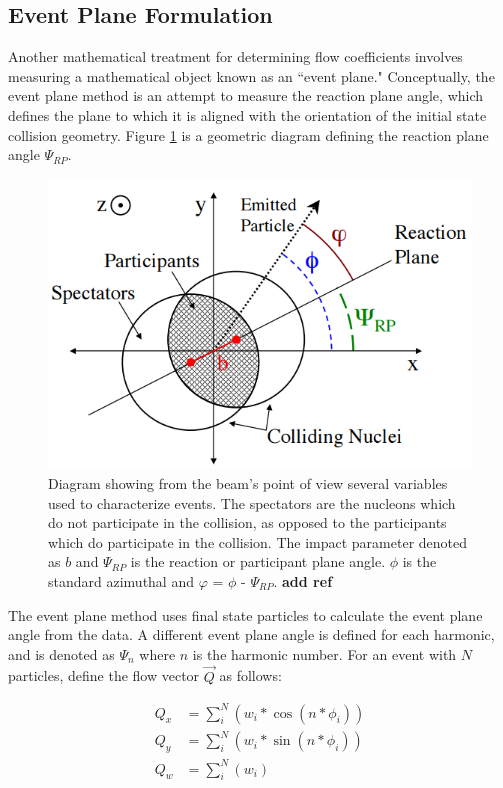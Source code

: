 \subsection{Event Plane Formulation}
Another mathematical treatment for determining flow coefficients involves measuring a mathematical object known as an ``event plane." Conceptually, the event plane method is an attempt to measure the reaction plane angle, which defines the plane to which it is aligned with the orientation of the initial state collision geometry. Figure \ref{fig:reaction_plane_diagram} is a geometric diagram defining the reaction plane angle $\Psi_{RP}$.

\begin{figure}[!ht]
\begin{center}
\includegraphics[width=0.68\linewidth]{figs/reaction_plane_diagram.PNG}%
\caption{Diagram showing from the beam’s point of view several variables used to characterize events. The spectators are the nucleons which do not participate in the collision, as opposed to the participants which do participate in the collision. The impact parameter denoted as $b$ and $\Psi_{RP}$ is the reaction or participant plane angle. $\phi$ is the standard azimuthal and $\varphi$ = $\phi$ - $\Psi_{RP}$. \textbf{add ref}}
\label{fig:reaction_plane_diagram}
\end{center}
\end{figure}

The event plane method uses final state particles to calculate the event plane angle from the data. A different event plane angle is defined for each harmonic, and is denoted as $\Psi_n$ where $n$ is the harmonic number. For an event with $N$ particles, define the flow vector $\vec{Q}$ as follows:

\begin{align}
Q_x &= \sum_i^{N}( w_i * \cos(n * \phi_i)) \\
Q_y &= \sum_i^{N}( w_i * \sin(n * \phi_i)) \\
Q_w &= \sum_i^{N}( w_i )
\label{eqn:general_ep_math}
\end{align}

